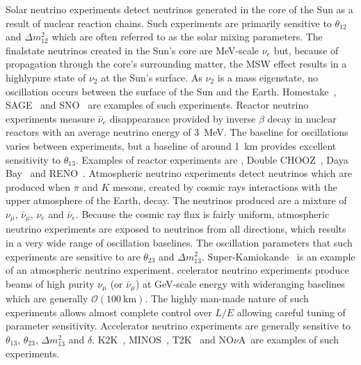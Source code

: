 \newline
Solar neutrino experiments detect neutrinos generated in the core of the Sun as a result of nuclear  reaction chains.  Such experiments are primarily sensitive to $\theta_{12}$ and $\Delta m^{2}_{12}$\Yoshi{,}{} which are often referred to as the solar mixing parameters.  The final\Yoshi{-}{}state neutrinos created in the Sun's core are MeV-scale $\nu_e$ but, because of propagation through the core's surrounding matter, the MSW effect results in a highly\Yoshi{-}{}pure state of $\nu_2$ at the Sun's surface.  As $\nu_2$ is a mass eigenstate, no oscillation occurs between the surface of the Sun and the Earth.  Homestake~\cite{0004-637X-496-1-505}, SAGE~\cite{PhysRevC.80.015807} and SNO~\cite{PhysRevLett.87.071301} are examples of such experiments.
\newline
\newline
Reactor neutrino experiments measure $\bar{\nu}_e$ disappearance provided by inverse $\beta$ decay in nuclear reactors with an average neutrino energy of 3~MeV.  The baseline for oscillations varies between experiments, but a baseline of around 1~km provides excellent sensitivity to $\theta_{13}$. Examples of reactor experiments are , Double CHOOZ~\cite{Abe201366}, Daya Bay~\cite{PhysRevLett.108.171803} and RENO~\cite{PhysRevLett.108.191802}.
\newline
\newline
Atmospheric neutrino experiments detect neutrinos which are produced when $\pi$ and $K$ mesons, created by cosmic rays interactions with the upper atmosphere of the Earth, decay.  The neutrinos produced are a mixture of $\nu_\mu$, $\bar{\nu}_\mu$, $\nu_e$ and $\bar{\nu}_e$.  Because the cosmic ray flux is fairly uniform, atmospheric neutrino experiments are exposed to neutrinos from all directions, which results in a very wide range of oscillation baselines.  The oscillation parameters that such experiments are sensitive to are $\theta_{23}$ and $\Delta m^2_{13}$. Super-Kamiokande~\cite{PhysRevLett.81.1562} is an example of an atmospheric neutrino experiment. 
\newline
\newline
{}ccelerator neutrino experiments produce beams of high purity $\nu_\mu$ (or $\bar{\nu}_\mu$) at GeV-scale energy with wideranging baselines which are generally $\mathcal{O}\left(100~\textrm{km}\right)$.  The highly man-made nature of such experiments allows almost complete control over $L/E$ allowing careful tuning of parameter sensitivity.  Accelerator neutrino experiments are generally sensitive to $\theta_{13}$, $\theta_{23}$, $\Delta m^{2}_{13}$ and $\delta$. K2K~\cite{PhysRevD.74.072003}, MINOS~\cite{PhysRevLett.97.191801}, T2K~\cite{PhysRevLett.112.061802} and NO$\nu$A~\cite{Ayres:2004js}are examples of such experiments.

